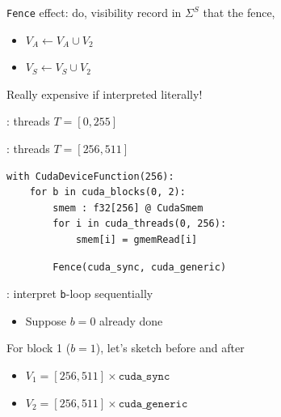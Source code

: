 \begin{minipage}[t]{0.42\textwidth}\fixminipage
\vspace{-6mm}

\texttt{Fence} effect: do,  visibility record in $\Sigma^S$ that  the fence,
\begin{itemize}
  \item $V_A \leftarrow V_A \cup V_2$
  \item $V_S \leftarrow V_S \cup V_2$
\end{itemize}
Really expensive if interpreted literally!


: threads $T = [0, 255]$

: threads $T = [256, 511]$

\begin{verbatim}
with CudaDeviceFunction(256):
    for b in cuda_blocks(0, 2):
        smem : f32[256] @ CudaSmem
        for i in cuda_threads(0, 256):
            smem[i] = gmemRead[i]
\end{verbatim}
\begin{mdframed}[style=MyFrame, backgroundcolor=violetBoxBg]
\color{violetBoxFg}
\begin{verbatim}
        Fence(cuda_sync, cuda_generic)
\end{verbatim}
\end{mdframed}

: interpret \texttt{b}-loop sequentially
\begin{itemize}
  \item Suppose $b=0$ already done
\end{itemize}

For block 1 ($b = 1$), let's sketch before and after
\begin{itemize}
  \item $V_1 = [256, 511] \times \texttt{cuda\_sync}$
  \item $V_2 = [256, 511] \times \texttt{cuda\_generic}$
\end{itemize}
\end{minipage}
\hfill
